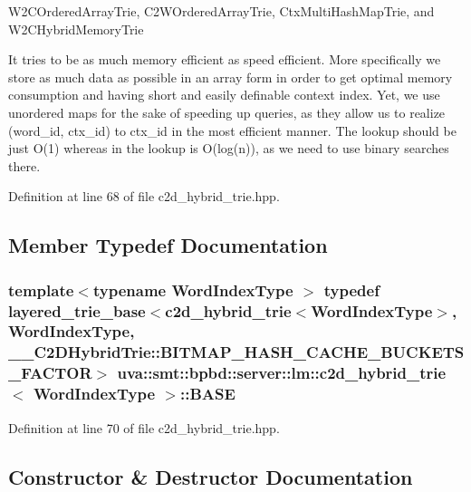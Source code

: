 W2\+C\+Ordered\+Array\+Trie, C2\+W\+Ordered\+Array\+Trie, Ctx\+Multi\+Hash\+Map\+Trie, and W2\+C\+Hybrid\+Memory\+Trie

It tries to be as much memory efficient as speed efficient. More specifically we store as much data as possible in an array form in order to get optimal memory consumption and having short and easily definable context index. Yet, we use unordered maps for the sake of speeding up queries, as they allow us to realize (word\+\_\+id, ctx\+\_\+id) to ctx\+\_\+id in the most efficient manner. The lookup should be just O(1) whereas in the lookup is O(log(n)), as we need to use binary searches there. 

Definition at line 68 of file c2d\+\_\+hybrid\+\_\+trie.\+hpp.



\subsection{Member Typedef Documentation}
\hypertarget{classuva_1_1smt_1_1bpbd_1_1server_1_1lm_1_1c2d__hybrid__trie_ad3be016130a12e0f2f2981760693caca}{}
\subsubsection[{B\+A\+S\+E}]{\setlength{\rightskip}{0pt plus 5cm}template$<$typename Word\+Index\+Type $>$ typedef {\bf layered\+\_\+trie\+\_\+base}$<${\bf c2d\+\_\+hybrid\+\_\+trie}$<${\bf Word\+Index\+Type}$>$, {\bf Word\+Index\+Type}, \+\_\+\+\_\+\+C2\+D\+Hybrid\+Trie\+::\+B\+I\+T\+M\+A\+P\+\_\+\+H\+A\+S\+H\+\_\+\+C\+A\+C\+H\+E\+\_\+\+B\+U\+C\+K\+E\+T\+S\+\_\+\+F\+A\+C\+T\+O\+R$>$ {\bf uva\+::smt\+::bpbd\+::server\+::lm\+::c2d\+\_\+hybrid\+\_\+trie}$<$ {\bf Word\+Index\+Type} $>$\+::{\bf B\+A\+S\+E}}\label{classuva_1_1smt_1_1bpbd_1_1server_1_1lm_1_1c2d__hybrid__trie_ad3be016130a12e0f2f2981760693caca}


Definition at line 70 of file c2d\+\_\+hybrid\+\_\+trie.\+hpp.



\subsection{Constructor \& Destructor Documentation}
\hypertarget{classuva_1_1smt_1_1bpbd_1_1server_1_1lm_1_1c2d__hybrid__trie_aff66fd60349c736cb01d174e0fa03012}{}
